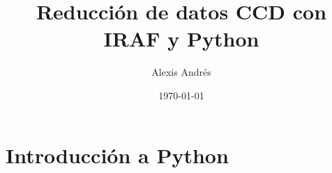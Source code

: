 \documentclass[11pt, letterpaper]{report}
\title{\bf\Huge Reducción de datos CCD con IRAF y Python}
\author{Alexis Andrés}
\date{\today}
\begin{document}
\renewcommand*\thepart{\arabic{part}}
\renewcommand{\partname}{Unidad}
\renewcommand{\chaptername}{Clase}
\renewcommand{\tablename}{Tabla}

\maketitle

\tableofcontents

\part{Introducción a Python}




\end{document}
